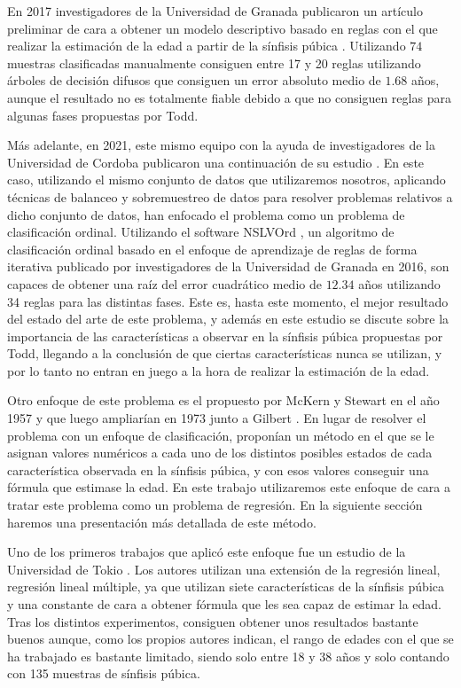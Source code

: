 En 2017 investigadores de la Universidad de Granada publicaron un artículo preliminar de cara a obtener un modelo descriptivo basado en reglas con el que realizar la estimación de la edad a partir de la sínfisis púbica \cite{fuzzyAgeEstimation}. Utilizando $74$ muestras clasificadas manualmente consiguen entre 17 y 20 reglas utilizando árboles de decisión difusos que consiguen un error absoluto medio de $1.68$ años, aunque el resultado no es totalmente fiable debido a que no consiguen reglas para algunas fases propuestas por Todd.

Más adelante, en 2021, este mismo equipo con la ayuda de investigadores de la Universidad de Cordoba publicaron una continuación de su estudio \cite{NSLVOrdAge}. En este caso, utilizando el mismo conjunto de datos que utilizaremos nosotros, aplicando técnicas de balanceo y sobremuestreo de datos para resolver problemas relativos a dicho conjunto de datos, han enfocado el problema como un problema de clasificación ordinal. Utilizando el software NSLVOrd \cite{NSLVOrd}, un algoritmo de clasificación ordinal basado en el enfoque de aprendizaje de reglas de forma iterativa publicado por investigadores de la Universidad de Granada en 2016, son capaces de obtener una raíz del error cuadrático medio de $12.34$ años utilizando 34 reglas para las distintas fases. Este es, hasta este momento, el mejor resultado del estado del arte de este problema, y además en este estudio se discute sobre la importancia de las características a observar en la sínfisis púbica propuestas por Todd, llegando a la conclusión de que ciertas características nunca se utilizan, y por lo tanto no entran en juego a la hora de realizar la estimación de la edad.



Otro enfoque de este problema es el propuesto por McKern y Stewart en el año 1957 \cite{primeraPropuestaMcKern} y que luego ampliarían en 1973 junto a Gilbert \cite{propuestaGilbert}. En lugar de resolver el problema con un enfoque de clasificación, proponían un método en el que se le asignan valores numéricos a cada uno de los distintos posibles estados de cada característica observada en la sínfisis púbica, y con esos valores conseguir una fórmula que estimase la edad. En este trabajo utilizaremos este enfoque de cara a tratar este problema como un problema de regresión. En la siguiente sección haremos una presentación más detallada de este método.

Uno de los primeros trabajos que aplicó este enfoque fue un estudio de la Universidad de Tokio \cite{primerTrabajoGilbert}. Los autores utilizan una extensión de la regresión lineal, regresión lineal múltiple, ya que utilizan siete características de la sínfisis púbica y una constante de cara a obtener fórmula que les sea capaz de estimar la edad. Tras los distintos experimentos, consiguen obtener unos resultados bastante buenos aunque, como los propios autores indican, el rango de edades con el que se ha trabajado es bastante limitado, siendo solo entre 18 y 38 años y solo contando con 135 muestras de sínfisis púbica.

